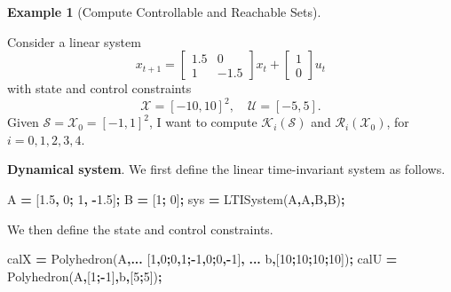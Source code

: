 \documentclass[
]{book}
\newenvironment{Shaded}{\begin{snugshade}}{\end{snugshade}}
\newcommand{\FloatTok}[1]{\textcolor[rgb]{0.00,0.00,0.81}{#1}}
\newcommand{\NormalTok}[1]{#1}
\newcommand{\OperatorTok}[1]{\textcolor[rgb]{0.81,0.36,0.00}{\textbf{#1}}}
\newcommand{\SpecialStringTok}[1]{\textcolor[rgb]{0.31,0.60,0.02}{#1}}
\newcommand{\VariableTok}[1]{\textcolor[rgb]{0.00,0.00,0.00}{#1}}
\theoremstyle{definition}
\theoremstyle{definition}
\newtheorem{example}{Example}[chapter]
\theoremstyle{definition}
\theoremstyle{definition}
\theoremstyle{remark}
\begin{document}
\begin{example}[Compute Controllable and Reachable Sets]
\protect\hypertarget{exm:compute-controllable-reachable-sets}{}\label{exm:compute-controllable-reachable-sets}

Consider a linear system
\[
x_{t+1} = \begin{bmatrix} 1.5 & 0 \\ 1 & -1.5 \end{bmatrix} x_t + \begin{bmatrix} 1 \\ 0 \end{bmatrix} u_t
\]
with state and control constraints
\[
\mathcal{X} = [-10,10]^2, \quad \mathcal{U} = [-5,5].
\]
Given \(\mathcal{S} = \mathcal{X}_0 = [-1,1]^2\), I want to compute \(\mathcal{K}_i(\mathcal{S})\) and \(\mathcal{R}_i(\mathcal{X}_0)\), for \(i=0,1,2,3,4\).

\textbf{Dynamical system}. We first define the linear time-invariant system as follows.

\begin{Shaded}
\begin{Highlighting}[]
\VariableTok{A} \OperatorTok{=}\NormalTok{ [}\FloatTok{1.5}\OperatorTok{,} \FloatTok{0}\OperatorTok{;} \FloatTok{1}\OperatorTok{,} \OperatorTok{{-}}\FloatTok{1.5}\NormalTok{]}\OperatorTok{;} \VariableTok{B} \OperatorTok{=}\NormalTok{ [}\FloatTok{1}\OperatorTok{;} \FloatTok{0}\NormalTok{]}\OperatorTok{;}
\VariableTok{sys} \OperatorTok{=} \VariableTok{LTISystem}\NormalTok{(}\SpecialStringTok{\textquotesingle{}A\textquotesingle{}}\OperatorTok{,}\VariableTok{A}\OperatorTok{,}\SpecialStringTok{\textquotesingle{}B\textquotesingle{}}\OperatorTok{,}\VariableTok{B}\NormalTok{)}\OperatorTok{;}
\end{Highlighting}
\end{Shaded}

We then define the state and control constraints.

\begin{Shaded}
\begin{Highlighting}[]
\VariableTok{calX} \OperatorTok{=} \VariableTok{Polyhedron}\NormalTok{(}\SpecialStringTok{\textquotesingle{}A\textquotesingle{}}\OperatorTok{,...}
\NormalTok{    [}\FloatTok{1}\OperatorTok{,}\FloatTok{0}\OperatorTok{;}\FloatTok{0}\OperatorTok{,}\FloatTok{1}\OperatorTok{;{-}}\FloatTok{1}\OperatorTok{,}\FloatTok{0}\OperatorTok{;}\FloatTok{0}\OperatorTok{,{-}}\FloatTok{1}\NormalTok{]}\OperatorTok{,} \OperatorTok{...}
    \SpecialStringTok{\textquotesingle{}b\textquotesingle{}}\OperatorTok{,}\NormalTok{[}\FloatTok{10}\OperatorTok{;}\FloatTok{10}\OperatorTok{;}\FloatTok{10}\OperatorTok{;}\FloatTok{10}\NormalTok{])}\OperatorTok{;}
\VariableTok{calU} \OperatorTok{=} \VariableTok{Polyhedron}\NormalTok{(}\SpecialStringTok{\textquotesingle{}A\textquotesingle{}}\OperatorTok{,}\NormalTok{[}\FloatTok{1}\OperatorTok{;{-}}\FloatTok{1}\NormalTok{]}\OperatorTok{,}\SpecialStringTok{\textquotesingle{}b\textquotesingle{}}\OperatorTok{,}\NormalTok{[}\FloatTok{5}\OperatorTok{;}\FloatTok{5}\NormalTok{])}\OperatorTok{;}
\end{Highlighting}
\end{Shaded}


\end{example}
\end{document}

